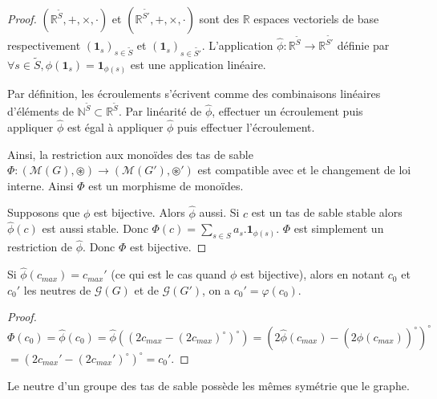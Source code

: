 \begin{proof}
$\left(\mathbb{R}^{\widetilde{S}}, +, \times, \cdot\right)$ et
$\left(\mathbb{R}^{\widetilde{S'}}, +, \times, \cdot\right)$
sont des $\mathbb{R}$ espaces vectoriels de base respectivement
$\left(\mathbf{1}_s\right)_{s \in \widetilde{S}}$ et
$\left(\mathbf{1}_s\right)_{s \in \widetilde{S'}}$.
L'application $\widehat{\phi}: \mathbb{R}^{\widetilde{S}} \rightarrow
\mathbb{R}^{\widetilde{S'}}$ définie par $\forall s \in \widetilde{S},
\widehat{\phi}(\mathbf{1}_s) = \mathbf{1}_{\phi(s)}$
est une application linéaire.

Par définition, les écroulements s'écrivent comme des combinaisons linéaires
d'éléments de $\mathbb{N}^{\widetilde{S}} \subset \mathbb{R}^{\widetilde{S}}$.
Par linéarité de $\widehat{\phi}$, effectuer un écroulement puis appliquer
$\widehat{\phi}$ est égal à appliquer $\widehat{\phi}$ puis effectuer
l'écroulement.

Ainsi, la restriction aux monoïdes des tas de sable
$\Phi: \left(\mathcal{M}(G), \circledast \right) \rightarrow
\left(\mathcal{M}(G'), \circledast' \right)$ est compatible avec
et le changement de loi interne.
Ainsi $\Phi$ est un morphisme de monoïdes.

Supposons que $\phi$ est bijective. Alors $\widehat{\phi}$ aussi.
Si $c$ est un tas de sable stable alors $\widehat{\phi}(c)$ est aussi stable.
Donc $\Phi(c) = \sum_{s \in S} a_s . \mathbf{1}_{\phi(s)}$.
$\Phi$ est simplement un restriction de $\widehat{\phi}$.
Donc $\Phi$ est bijective.
\end{proof}

\begin{proposition}
Si $\widehat{\phi}(c_{max}) = c_{max}'$ (ce qui est le cas quand $\phi$ est
bijective), alors en notant $c_0$ et $c_0'$ les neutres de $\mathcal{G}(G)$ et
de $\mathcal{G}(G')$, on a $c_0' = \varphi(c_0)$.
\end{proposition}

\begin{proof}
$\Phi(c_0)
= \widehat{\phi}(c_0)
= \widehat{\phi}\left(\left(2 c_{max} - \left(2 c_{max}\right)^\circ \right)^\circ\right)
= \left(2 \widehat{\phi}\left(c_{max}\right) - \left(2 \widehat{\phi}\left(c_{max}\right)\right)^\circ \right)^\circ$ \\
$= \left(2 c_{max}' - \left(2 c_{max}'\right)^\circ \right)^\circ
= c_0'$.
\end{proof}

\begin{corollaire}
Le neutre d'un groupe des tas de sable possède les mêmes symétrie que le graphe.
\end{corollaire}

